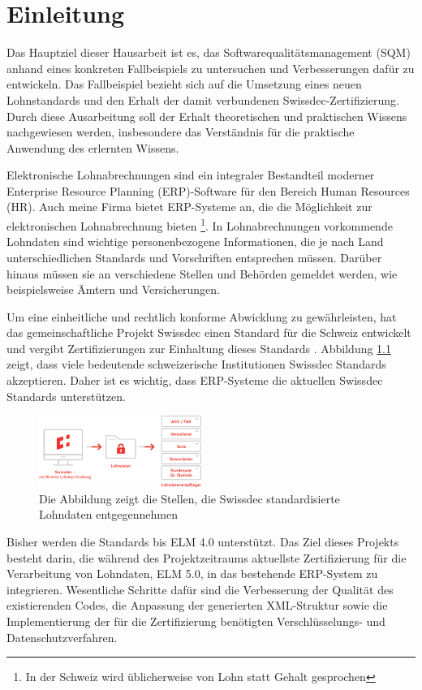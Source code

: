 \chapter{Einleitung}



Das Hauptziel dieser Hausarbeit ist es, das Softwarequalitätsmanagement (SQM) anhand eines konkreten Fallbeispiels zu untersuchen und Verbesserungen dafür zu entwickeln.
Das Fallbeispiel bezieht sich auf die Umsetzung eines neuen Lohnstandards und den Erhalt der damit verbundenen Swissdec-Zertifizierung.
Durch diese Ausarbeitung soll der Erhalt theoretischen und praktischen Wissens nachgewiesen werden, insbesondere das Verständnis für die praktische Anwendung des erlernten Wissens. 

Elektronische Lohnabrechnungen sind ein integraler Bestandteil moderner Enterprise Resource Planning (ERP)-Software für den Bereich Human Resources (HR).
Auch meine Firma bietet ERP-Systeme an, die die Möglichkeit zur elektronischen Lohnabrechnung bieten \footnote{In der Schweiz wird üblicherweise von Lohn statt Gehalt gesprochen}.
In Lohnabrechnungen vorkommende Lohndaten sind wichtige personenbezogene Informationen, die je nach Land unterschiedlichen Standards und Vorschriften entsprechen müssen.
Darüber hinaus müssen sie an verschiedene Stellen und Behörden gemeldet werden, wie beispielsweise Ämtern und Versicherungen. 

Um eine einheitliche und rechtlich konforme Abwicklung zu gewährleisten, hat das gemeinschaftliche Projekt Swissdec einen Standard für die Schweiz entwickelt und vergibt Zertifizierungen zur Einhaltung dieses Standards  \cite{Swissdec.06.05.2023}. 
Abbildung \ref{fig:dh-website} zeigt, dass viele bedeutende schweizerische Institutionen Swissdec Standards akzeptieren. Daher ist es wichtig, dass ERP-Systeme die aktuellen Swissdec Standards unterstützen.

\begin{figure}
	\centering
	\includegraphics[width=200px]{Bilder/grafik_lohndaten_de.png} 
	\caption{Die Abbildung zeigt die Stellen, die Swissdec standardisierte Lohndaten entgegennehmen \cite{Swissdec.06.05.2023}}
	\label{fig:dh-website}
\end{figure} 

Bisher werden die Standards bis ELM 4.0 unterstützt.
Das Ziel dieses Projekts besteht darin, die während des Projektzeitraums aktuellste Zertifizierung für die Verarbeitung von Lohndaten, ELM 5.0, in das bestehende ERP-System zu integrieren.
Wesentliche Schritte dafür sind die Verbesserung der Qualität des existierenden Codes, die Anpassung der generierten XML-Struktur sowie die Implementierung der für die Zertifizierung benötigten Verschlüsselungs- und Datenschutzverfahren.
 










